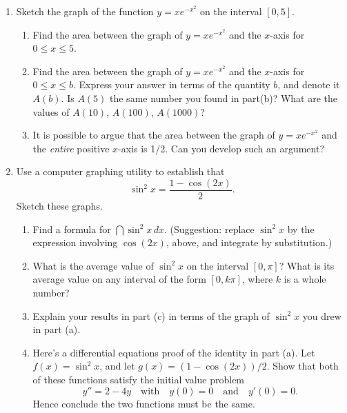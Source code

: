 \begin{enumerate}
\begin{enumerate}
\end{enumerate}
\item Sketch the graph of the function $y = x e^{-x^2}$
on the interval $[0, 5]$.

  \begin{enumerate}
  \item Find the area between the graph of $y = x e^{-x^2}$
and the $x$-axis for $0 \leq x \leq 5$.

  \item Find the area between the graph of $y = x e^{-x^2}$
and the $x$-axis for $0 \leq x \leq b$.  Express your answer in terms
of the quantity $b$, and denote it $A(b)$.  Is $A(5)$ the same number
you found in part(b)?  What are the values of $A(10)$, $A(100)$,
$A(1000)$?

  \item It is possible to argue that the area between the graph of $y = x
e^{-x^2}$ and the {\em entire\/} positive $x$-axis is
1/2.  Can you develop such an argument?



\end{enumerate}
\item Use a computer graphing utility to establish that
	\[
\sin^2{x} = \dfrac{1 - \cos(2x)}{2}.
\]
Sketch these graphs.

  \begin{enumerate}
  \item Find a formula for $\dint \sin^2{x} \, dx$.  (Suggestion: replace
$\sin^2{x}$ by the expression involving $\cos(2x)$, above, and
integrate by substitution.)


  \item What is the average value of $\sin^2{x}$ on the interval $[0,
  \pi]$?  What is its average value on any interval of the form $[0, k
  \pi]$, where $k$ is a whole number?

  \item Explain your results in part (c) in terms of the graph of
$\sin^2{x}$ you drew in part (a).

  \item Here's a differential equations proof of the identity in part
(a).  Let $f(x)=\sin^2{x}$, and let $g(x)=(1 - \cos(2x))/2$.  Show
that both of these functions satisfy the initial value problem
\[
y''=2-4y \quad\mbox{with}\quad y(0)=0\quad\mbox{and}\quad y'(0)=0.
\]
Hence conclude the two functions must be the same.  



\end{enumerate}
\end{enumerate}
